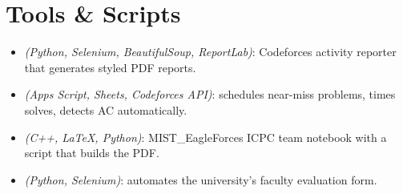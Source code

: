 \section{Tools \& Scripts}
{\small\begin{itemize}
  \item \textbf{} \textit{\color{gray}(Python, Selenium, BeautifulSoup, ReportLab)}: Codeforces activity reporter that generates styled PDF reports.
  \item \textbf{} \textit{\color{gray}(Apps Script, Sheets, Codeforces API)}: schedules near-miss problems, times solves, detects AC automatically.
  \item \textbf{} \textit{\color{gray}(C++, LaTeX, Python)}: MIST\_EagleForces ICPC team notebook with a script that builds the PDF.
  \item \textbf{} \textit{\color{gray}(Python, Selenium)}: automates the university's faculty evaluation form.
\end{itemize}}

